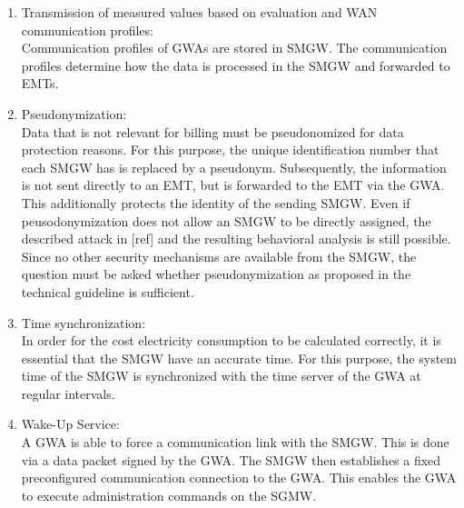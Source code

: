 \begin{enumerate}
\item Transmission of measured values based on evaluation and WAN communication profiles:\\
Communication profiles of GWAs are stored in SMGW. The communication profiles determine how the data is processed in the SMGW and forwarded to EMTs.

\item Pseudonymization:\\
Data that is not relevant for billing must be pseudonomized for data protection reasons. For this purpose, the unique identification number that each SMGW has is replaced by a pseudonym. Subsequently, the information is not sent directly to an EMT, but is forwarded to the EMT via the GWA. This additionally protects the identity of the sending SMGW.%
Even if peusodonymization does not allow an SMGW to be directly assigned, the described attack in [ref] and the resulting behavioral analysis is still possible. Since no other security mechanisms are available from the SMGW, the question must be asked whether pseudonymization as proposed in the technical guideline is sufficient.

\item Time synchronization:\\
In order for the cost electricity consumption to be calculated correctly, it is essential that the SMGW have an accurate time. For this purpose, the system time of the SMGW is synchronized with the time server of the GWA at regular intervals.

\item Wake-Up Service:\\
A GWA is able to force a communication link with the SMGW. This is done via a data packet signed by the GWA. The SMGW then establishes a fixed preconfigured communication connection to the GWA. This enables the GWA to execute administration commands on the SGMW. 
\end{enumerate}
